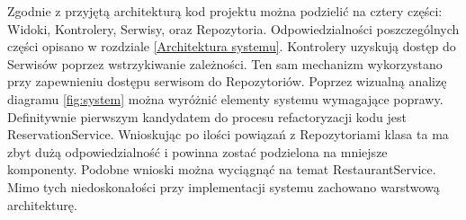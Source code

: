 \documentclass{article}
\begin{document}
Zgodnie z przyjętą architekturą kod projektu można podzielić na cztery części: Widoki, Kontrolery, Serwisy, oraz Repozytoria. Odpowiedzialności poszczególnych części opisano w rozdziale \ref{Architektura systemu}. Kontrolery uzyskują dostęp do Serwisów poprzez wstrzykiwanie zależności. Ten sam mechanizm wykorzystano przy zapewnieniu dostępu serwisom do Repozytoriów. Poprzez wizualną analizę diagramu \ref{fig:system} można wyróżnić elementy systemu wymagające poprawy. Definitywnie pierwszym kandydatem do procesu refactoryzacji kodu jest ReservationService. Wnioskując po ilości powiązań z Repozytoriami klasa ta ma zbyt dużą odpowiedzialność i powinna zostać podzielona na mniejsze komponenty. Podobne wnioski można wyciągnąć na temat RestaurantService. Mimo tych niedoskonałości przy implementacji systemu zachowano warstwową architekturę.
\end{document}
